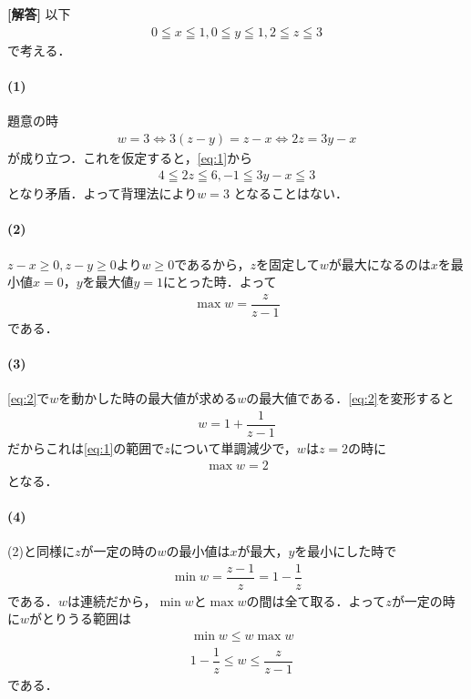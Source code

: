 \documentclass[../../main.tex]{subfiles}
\begin{document}
\begin{oframed}
  
\end{oframed}

{\bf [解答]}
以下
\begin{align}
  0 \leqq x \leqq 1, 0 \leqq y \leqq 1, 2 \leqq z \leqq 3 \label{eq:1}
\end{align}
で考える．

\paragraph{(1)}
題意の時
\begin{align}
  w = 3 \iff 3(z-y) = z-x \iff 2z = 3y-x
\end{align}
が成り立つ．これを仮定すると，\cref{eq:1}から
\begin{align}
  4 \leqq 2z \leqq 6, -1 \leqq 3y-x \leqq 3
\end{align}
となり矛盾．よって背理法により$w=3$ となることはない．

\paragraph{(2)}
$z-x \ge 0, z-y \ge 0$より$w\ge 0$であるから，$z$を固定して$w$が最大になるのは$x$を最小値$x=0$，$y$を最大値$y=1$にとった時．よって
\begin{align}
  \max w =  \dfrac{z}{z-1} \label{eq:2}
\end{align}
である．

\paragraph{(3)}
\cref{eq:2}で$w$を動かした時の最大値が求める$w$の最大値である．\cref{eq:2}を変形すると
\begin{align}
  w = 1 + \dfrac{1}{z-1}
\end{align}
だからこれは\cref{eq:1}の範囲で$z$について単調減少で，$w$は$z=2$の時に
\begin{align}
  \max w = 2
\end{align}
となる．

\paragraph{(4)}
(2)と同様に$z$が一定の時の$w$の最小値は$x$が最大，$y$を最小にした時で
\begin{align}
  \min w = \dfrac{z-1}{z} = 1-\dfrac{1}{z}
\end{align}
である．$w$は連続だから，$\min w$と$\max w$の間は全て取る．よって$z$が一定の時に$w$がとりうる範囲は
\begin{align}
  &\min w \le w \max w \\
  &1-\dfrac{1}{z} \le w \le \dfrac{z}{z-1}
\end{align}
である．
\end{document}
